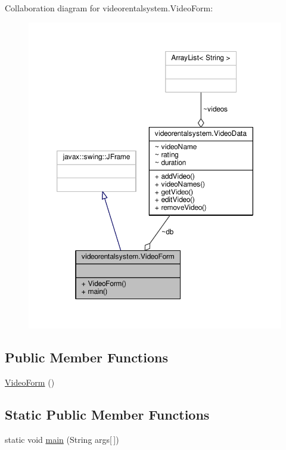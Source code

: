 Collaboration diagram for videorentalsystem.\-Video\-Form\-:
\nopagebreak
\begin{figure}[H]
\begin{center}
\leavevmode
\includegraphics[width=350pt]{classvideorentalsystem_1_1VideoForm__coll__graph}
\end{center}
\end{figure}
\subsection*{Public Member Functions}
\begin{DoxyCompactItemize}
\item 
\hyperlink{classvideorentalsystem_1_1VideoForm_aab99df615d3ee1ede6610865c3de4d24}{Video\-Form} ()
\end{DoxyCompactItemize}
\subsection*{Static Public Member Functions}
\begin{DoxyCompactItemize}
\item 
static void \hyperlink{classvideorentalsystem_1_1VideoForm_a9809e72aae5f98338e62e4d1751c331c}{main} (String args\mbox{[}$\,$\mbox{]})
\end{DoxyCompactItemize}


